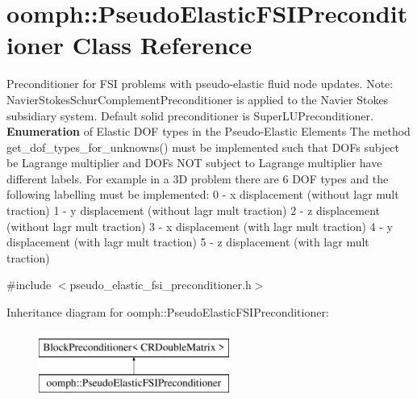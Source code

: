 \hypertarget{classoomph_1_1PseudoElasticFSIPreconditioner}{}\section{oomph\+:\+:Pseudo\+Elastic\+F\+S\+I\+Preconditioner Class Reference}
\label{classoomph_1_1PseudoElasticFSIPreconditioner}


Preconditioner for F\+SI problems with pseudo-\/elastic fluid node updates. Note\+: Navier\+Stokes\+Schur\+Complement\+Preconditioner is applied to the Navier Stokes subsidiary system. Default solid preconditioner is Super\+L\+U\+Preconditioner. {\bfseries Enumeration} of Elastic D\+OF types in the Pseudo-\/\+Elastic Elements The method get\+\_\+dof\+\_\+types\+\_\+for\+\_\+unknowns() must be implemented such that D\+O\+Fs subject be Lagrange multiplier and D\+O\+Fs N\+OT subject to Lagrange multiplier have different labels. For example in a 3D problem there are 6 D\+OF types and the following labelling must be implemented\+: 0 -\/ x displacement (without lagr mult traction) 1 -\/ y displacement (without lagr mult traction) 2 -\/ z displacement (without lagr mult traction) 3 -\/ x displacement (with lagr mult traction) 4 -\/ y displacement (with lagr mult traction) 5 -\/ z displacement (with lagr mult traction)  




{\ttfamily \#include $<$pseudo\+\_\+elastic\+\_\+fsi\+\_\+preconditioner.\+h$>$}

Inheritance diagram for oomph\+:\+:Pseudo\+Elastic\+F\+S\+I\+Preconditioner\+:\begin{figure}[H]
\begin{center}
\leavevmode
\includegraphics[height=2.000000cm]{classoomph_1_1PseudoElasticFSIPreconditioner}
\end{center}
\end{figure}
